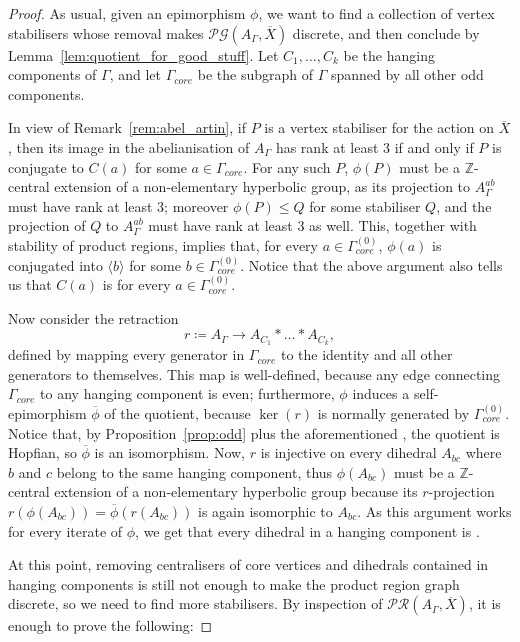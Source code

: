\documentclass[svgnames]{amsart}
\theoremstyle{plain}
\theoremstyle{definition}
\newcommand{\Z}{\mathbb{Z}}
\newcommand{\ov}[1]{\overline{#1}}
\begin{document}
\begin{proof}
As usual, given an epimorphism $\phi$, we want to find a collection of \good{} vertex stabilisers whose removal makes $\mathcal{PG}(A_\Gamma, \ov X)$ discrete, and then conclude by Lemma~\ref{lem:quotient_for_good_stuff}. Let $C_1,\ldots, C_k$ be the hanging components of $\Gamma$, and let $\Gamma_{core}$ be the subgraph of $\Gamma$ spanned by all other odd components. 
\par\medskip

In view of Remark~\ref{rem:abel_artin}, if $P$ is a vertex stabiliser for the action on $\ov X$, then its image in the abelianisation of $A_\Gamma$ has rank at least $3$ if and only if $P$ is conjugate to $C(a)$ for some $a\in \Gamma_{core}$. For any such $P$, $\phi(P)$ must be a $\Z$-central extension of a non-elementary hyperbolic group, as its projection to $A_\Gamma^{ab}$ must have rank at least 3; moreover $\phi(P)\le Q$ for some stabiliser $Q$, and the projection of $Q$ to $A_\Gamma^{ab}$ must have rank at least 3 as well. This, together with stability of product regions, implies that, for every $a\in \Gamma_{core}^{(0)}$, $\phi(a)$ is conjugated into $\langle b\rangle$ for some $b\in \Gamma_{core}^{(0)}$. Notice that the above argument also tells us that $C(a)$ is \good{} for every $a\in \Gamma_{core}^{(0)}$.
\par\medskip

Now consider the retraction
$$r\coloneq A_\Gamma\to A_{C_1}*\ldots*A_{C_k},$$
defined by mapping every generator in $\Gamma_{core}$ to the identity and all other generators to themselves. This map is well-defined, because any edge connecting $\Gamma_{core}$ to any hanging component is even; furthermore, $\phi$ induces a self-epimorphism $\ov\phi$ of the quotient, because $\ker(r)$ is normally generated by $\Gamma_{core}^{(0)}$. Notice that, by Proposition~\ref{prop:odd} plus the aforementioned \cite[Theorem 1.1]{DeyNeumann_free_prod_Hopf}, the quotient is Hopfian, so $\ov\phi$ is an isomorphism. Now, $r$ is injective on every dihedral $A_{bc}$ where $b$ and $c$ belong to the same hanging component, thus $\phi(A_{bc})$ must be a $\Z$-central extension of a non-elementary hyperbolic group because its $r$-projection $r(\phi(A_{bc}))=\ov\phi(r(A_{bc}))$ is again isomorphic to $A_{bc}$. As this argument works for every iterate of $\phi$, we get that every dihedral in a hanging component is \good{}.

At this point, removing centralisers of core vertices and dihedrals contained in hanging components is still not enough to make the product region graph discrete, so we need to find more \good{} stabilisers. By inspection of $\mathcal{PR}(A_\Gamma, \ov X)$, it is enough to prove the following: 


\end{proof}
\end{document}
